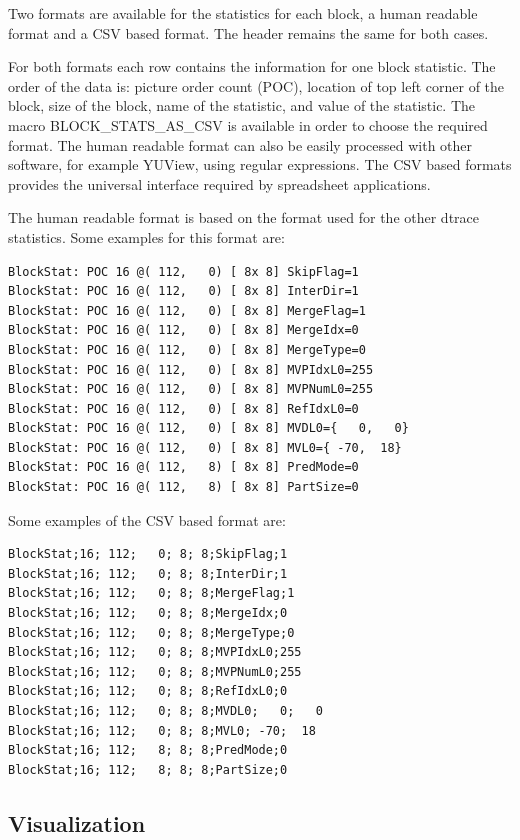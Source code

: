 \documentclass[a4paper,11pt]{jvetdoc}
\begin{document}
Two formats are available for the statistics for each block, a human readable
format and a CSV based format. The header remains the same for both cases. 

For both formats each row contains the information for one block statistic. The
order of the data is: picture order count (POC), location of top left corner of
the block, size of the block, name of the statistic, and value of the
statistic. 
The macro BLOCK_STATS_AS_CSV is available in order to choose the required format.
The human readable format can also be easily processed with other software, for
example YUView, using regular expressions. The CSV based formats provides the
universal interface required by spreadsheet applications.

The human readable format is based on the format used for the other dtrace
statistics. Some examples for this format are:
\begin{verbatim}
BlockStat: POC 16 @( 112,   0) [ 8x 8] SkipFlag=1
BlockStat: POC 16 @( 112,   0) [ 8x 8] InterDir=1
BlockStat: POC 16 @( 112,   0) [ 8x 8] MergeFlag=1
BlockStat: POC 16 @( 112,   0) [ 8x 8] MergeIdx=0
BlockStat: POC 16 @( 112,   0) [ 8x 8] MergeType=0
BlockStat: POC 16 @( 112,   0) [ 8x 8] MVPIdxL0=255
BlockStat: POC 16 @( 112,   0) [ 8x 8] MVPNumL0=255
BlockStat: POC 16 @( 112,   0) [ 8x 8] RefIdxL0=0
BlockStat: POC 16 @( 112,   0) [ 8x 8] MVDL0={   0,   0}
BlockStat: POC 16 @( 112,   0) [ 8x 8] MVL0={ -70,  18}
BlockStat: POC 16 @( 112,   8) [ 8x 8] PredMode=0
BlockStat: POC 16 @( 112,   8) [ 8x 8] PartSize=0
\end{verbatim}

Some examples of the CSV based format are:
\begin{verbatim}
BlockStat;16; 112;   0; 8; 8;SkipFlag;1
BlockStat;16; 112;   0; 8; 8;InterDir;1
BlockStat;16; 112;   0; 8; 8;MergeFlag;1
BlockStat;16; 112;   0; 8; 8;MergeIdx;0
BlockStat;16; 112;   0; 8; 8;MergeType;0
BlockStat;16; 112;   0; 8; 8;MVPIdxL0;255
BlockStat;16; 112;   0; 8; 8;MVPNumL0;255
BlockStat;16; 112;   0; 8; 8;RefIdxL0;0
BlockStat;16; 112;   0; 8; 8;MVDL0;   0;   0
BlockStat;16; 112;   0; 8; 8;MVL0; -70;  18
BlockStat;16; 112;   8; 8; 8;PredMode;0
BlockStat;16; 112;   8; 8; 8;PartSize;0
\end{verbatim}

\subsection{Visualization}
\label{sec:visualization}
\end{document}
